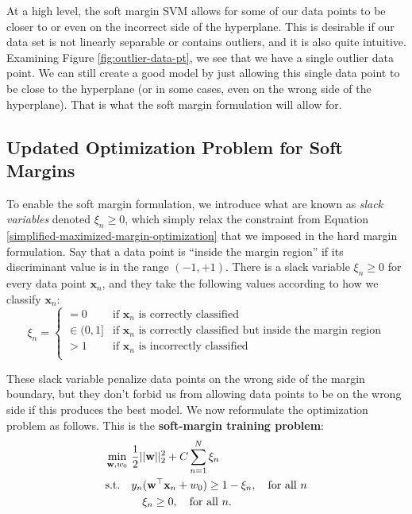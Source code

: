 At a high level, the soft margin SVM allows for some of our data points to be closer to or even on the incorrect side of the hyperplane. This is desirable if our data set is not linearly separable or contains outliers, and it is also quite intuitive. Examining Figure \ref{fig:outlier-data-pt}, we see that we have a single outlier data point. We can still create a good model by just allowing this single data point to be close to the hyperplane (or in some cases, even on the wrong side of the hyperplane). That is what the soft margin formulation will allow for.

\subsection{Updated Optimization Problem for Soft Margins}

To enable the soft margin formulation, we introduce what are known as \textit{slack variables} denoted $\xi_{n} \geq 0$, which simply relax the constraint from Equation \ref{simplified-maximized-margin-optimization} that we imposed in the hard margin formulation.
Say that a data point is ``inside the margin region'' if its discriminant value is in the range $(-1,+1)$.
%
There is a slack variable $\xi_{n} \geq 0$ for every data point $\textbf{x}_{n}$, and they take the following values according to how we classify $\textbf{x}_{n}$:
%
\begin{equation} \label{slack-variable-values}
	\xi_{n} = \begin{cases}
	 	= 0 & \text{if  $\textbf{x}_{n}$  is correctly classified} \\
		\in (0, 1] & \text{if $\textbf{x}_{n}$  is correctly classified but inside the  margin region} \\
		> 1 & \text{if $\textbf{x}_{n}$ is  incorrectly classified} \\
	\end{cases}
      \end{equation}
      
      These slack variable penalize data points on the wrong side of the margin boundary, but they don't forbid us from allowing data points to be on the wrong side if this produces the best model.
      We now reformulate the optimization problem as follows. This is the {\bf soft-margin training problem}:
%
%
      \begin{align} \label{soft-margin-optimization-problem}
  \underset{\textbf{w}, w_{0}}{\min}\ &  \frac{1}{2} ||\textbf{w}||_2^{2} + C \sum_{n=1}^{N} \xi_{n}\\
  \mbox{s.t.}\quad & y_{n}(\textbf{w}^\top\textbf{x}_{n} + w_{0}) \geq 1 - \xi_{n}, \quad \mbox{for all $n$} \notag \\
  &\quad \xi_{n} \geq 0, \quad \mbox{for all $n$}. \notag
\end{align}

